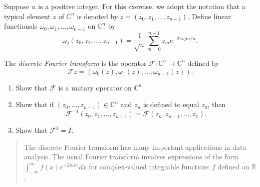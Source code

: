 \begin{exercise}
    Suppose $n$ is a positive integer. For this exercise, we adopt the notation that
    a typical element $z$ of $\mathbb{C}^{n}$ is denoted by $z = (z_{0}, z_{1}, \ldots, z_{n-1})$. Define linear functionals $\omega_{0}, \omega_{1}, \ldots, \omega_{n-1}$ on $\mathbb{C}^{n}$ by
    \[
        \omega_{j}(z_{0}, z_{1}, \ldots, z_{n-1}) = \frac{1}{\sqrt{n}}\sum^{n-1}_{m=0}z_{m}e^{-2\pi \iota jm/n}.
    \]

    The \textit{discrete Fourier transform} is the operator $\mathscr{F}: \mathbb{C}^{n}\to \mathbb{C}^{n}$ defined by
    \[
        \mathscr{F}z = (\omega_{0}(z), \omega_{1}(z), \ldots, \omega_{n-1}(z)).
    \]

    \begin{enumerate}[label={(\alph*)}]
        \item Show that $\mathscr{F}$ is a unitary operator on $\mathbb{C}^{n}$.
        \item Show that if $(z_{0}, \ldots, z_{n-1})\in\mathbb{C}^{n}$ and $z_{n}$ is defined to equal $z_{0}$, then
              \[
                  \mathscr{F}^{-1}(z_{0}, z_{1}, \ldots, z_{n-1}) = \mathscr{F}(z_{n}, z_{n-1}, \ldots, z_{1}).
              \]
        \item Show that $\mathscr{F}^{4} = I$.
    \end{enumerate}
\end{exercise}

\begin{quote}
    The discrete Fourier transform has many important applications in data analysis. The usual Fourier transform involves expressions of the form $\int^{\infty}_{-\infty}f(x)e^{-2\pi \iota tx}dx$ for complex-valued integrable functions $f$ defined on $\mathbb{R}$.
\end{quote}

